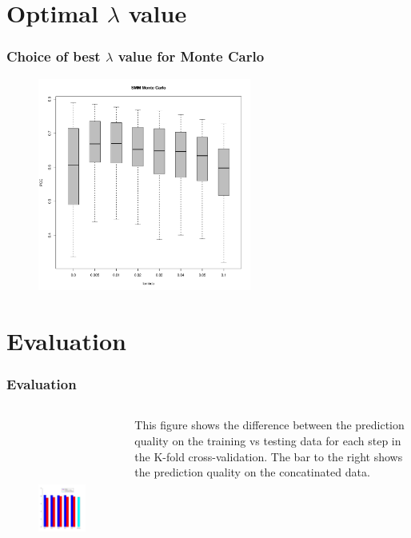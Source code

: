 \documentclass[presentation]{beamer}   %
\begin{document}
\section{Optimal $\lambda$ value}
\begin{frame}
  \frametitle{Choice of best $\lambda$ value for Monte Carlo}
	\begin{figure}
		\centering
		\includegraphics[width=70mm,height=70mm]{fig/choice_lambda_mc.pdf}
	\end{figure}
\end{frame}

\section{Evaluation}
\begin{frame}
  \frametitle{Evaluation}
  \begin{columns}[t] %
		\begin{figure}
		\centering
			\includegraphics[width=60mm,height=60mm]{fig/barplot.pdf}
		\end{figure}
		\begin{block}\centering
		This figure shows the difference between the prediction quality on the training vs testing data for each step in the K-fold cross-validation. The bar to the right shows the prediction quality on the concatinated data.
		\end{block}
  \end{columns}
\end{frame}
\end{document}
